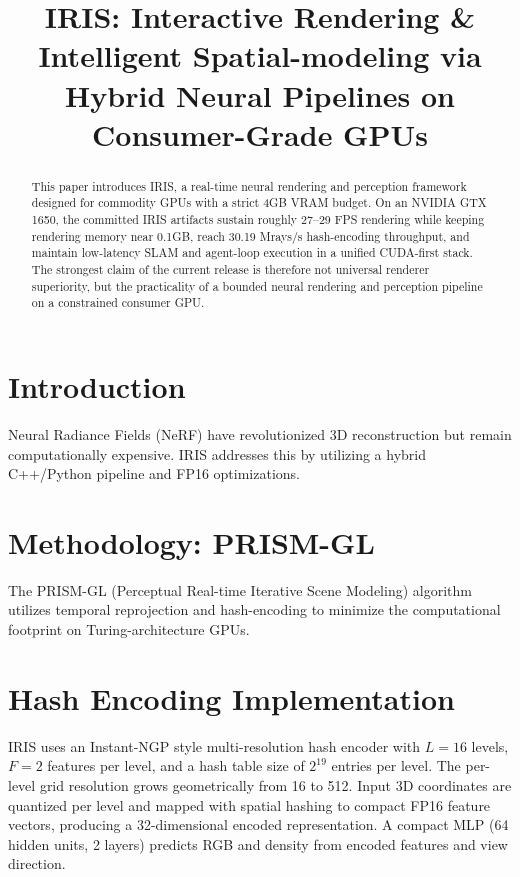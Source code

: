 \documentclass[conference]{IEEEtran}
\begin{document}
\title{IRIS: Interactive Rendering \& Intelligent Spatial-modeling via Hybrid Neural Pipelines on Consumer-Grade GPUs}

\author{
}

\maketitle

\begin{abstract}
This paper introduces IRIS, a real-time neural rendering and perception framework designed for commodity GPUs with a strict 4GB VRAM budget. On an NVIDIA GTX 1650, the committed IRIS artifacts sustain roughly 27--29 FPS rendering while keeping rendering memory near 0.1GB, reach 30.19 Mrays/s hash-encoding throughput, and maintain low-latency SLAM and agent-loop execution in a unified CUDA-first stack. The strongest claim of the current release is therefore not universal renderer superiority, but the practicality of a bounded neural rendering and perception pipeline on a constrained consumer GPU.
\end{abstract}

\section{Introduction}
Neural Radiance Fields (NeRF) have revolutionized 3D reconstruction but remain computationally expensive. IRIS addresses this by utilizing a hybrid C++/Python pipeline and FP16 optimizations.

\section{Methodology: PRISM-GL}
The PRISM-GL (Perceptual Real-time Iterative Scene Modeling) algorithm utilizes temporal reprojection and hash-encoding to minimize the computational footprint on Turing-architecture GPUs.

\section{Hash Encoding Implementation}
IRIS uses an Instant-NGP style multi-resolution hash encoder with $L=16$ levels, $F=2$ features per level, and a hash table size of $2^{19}$ entries per level. The per-level grid resolution grows geometrically from 16 to 512. Input 3D coordinates are quantized per level and mapped with spatial hashing to compact FP16 feature vectors, producing a 32-dimensional encoded representation. A compact MLP (64 hidden units, 2 layers) predicts RGB and density from encoded features and view direction.
\end{document}
